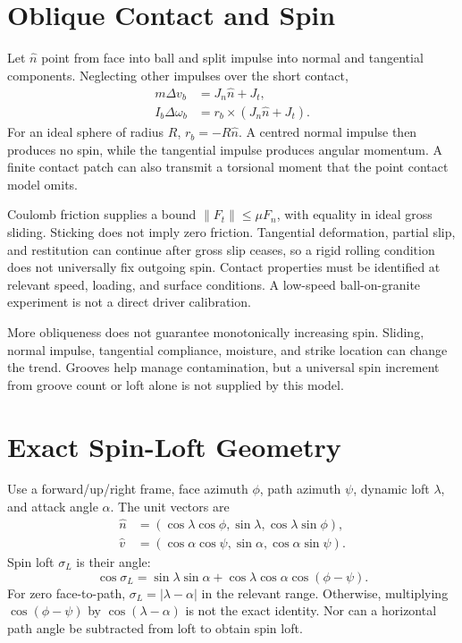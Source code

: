 \section{Oblique Contact and Spin}

Let $\hat n$ point from face into ball and split impulse into normal and
tangential components. Neglecting other impulses over the short contact,
\begin{align}
m\Delta v_b&=J_n\hat n+J_t,\\
I_b\Delta\omega_b&=r_b\times(J_n\hat n+J_t).
\end{align}
For an ideal sphere of radius $R$, $r_b=-R\hat n$. A centred normal impulse
then produces no spin, while the tangential impulse produces angular momentum.
A finite contact patch can also transmit a torsional moment that the point
contact model omits.

Coulomb friction supplies a bound $\|F_t\|\le\mu F_n$, with equality in
ideal gross sliding. Sticking does not imply zero friction. Tangential
deformation, partial slip, and restitution can continue after gross slip
ceases, so a rigid rolling condition does not universally fix outgoing spin.
Contact properties must be identified at relevant speed, loading, and surface
conditions. A low-speed ball-on-granite experiment is not a direct driver
calibration.

More obliqueness does not guarantee monotonically increasing spin. Sliding,
normal impulse, tangential compliance, moisture, and strike location can change
the trend. Grooves help manage contamination, but a universal spin increment
from groove count or loft alone is not supplied by this model.

\section{Exact Spin-Loft Geometry}

Use a forward/up/right frame, face azimuth $\phi$, path azimuth $\psi$,
dynamic loft $\lambda$, and attack angle $\alpha$. The unit vectors are
\begin{align}
\hat n&=(\cos\lambda\cos\phi,\sin\lambda,\cos\lambda\sin\phi),\\
\hat v&=(\cos\alpha\cos\psi,\sin\alpha,\cos\alpha\sin\psi).
\end{align}
Spin loft $\sigma_L$ is their angle:
\begin{equation}
\cos\sigma_L=\sin\lambda\sin\alpha+
\cos\lambda\cos\alpha\cos(\phi-\psi).
\end{equation}
For zero face-to-path, $\sigma_L=|\lambda-\alpha|$ in the relevant range.
Otherwise, multiplying $\cos(\phi-\psi)$ by $\cos(\lambda-\alpha)$ is not
the exact identity. Nor can a horizontal path angle be subtracted from loft
to obtain spin loft.

